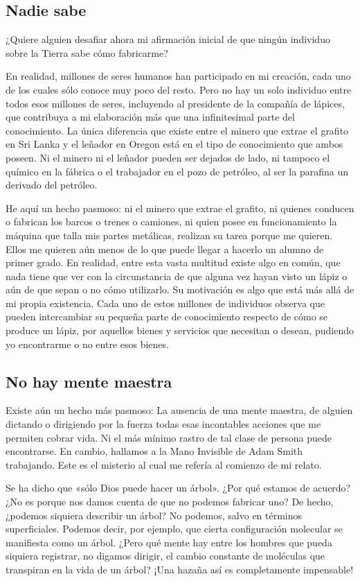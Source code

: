 \documentclass[12pt,a4paper,twoside]{book}
\begin{document}
\subsection{Nadie sabe}
¿Quiere alguien desafiar ahora mi afirmación inicial de que ningún individuo sobre la Tierra sabe cómo fabricarme?

En realidad, millones de seres humanos han participado en mi creación, cada uno de los cuales sólo conoce muy poco del resto. Pero no hay un solo individuo entre todos esos millones de seres, incluyendo al presidente de la compañía de lápices, que contribuya a mi elaboración más que una infinitesimal parte del conocimiento. La única diferencia que existe entre el minero que extrae el grafito en Sri Lanka y el leñador en Oregon está en el tipo de conocimiento que ambos poseen. Ni el minero ni el leñador pueden ser dejados de lado, ni tampoco el químico en la fábrica o el trabajador en el pozo de petróleo, al ser la parafina un derivado del petróleo.

He aquí un hecho pasmoso: ni el minero que extrae el grafito, ni quienes conducen o fabrican los barcos o trenes o camiones, ni quien posee en funcionamiento la máquina que talla mis partes metálicas, realizan su tarea porque me quieren. Ellos me quieren aún menos de lo que puede llegar a hacerlo un alumno de primer grado. En realidad, entre esta vasta multitud existe algo en común, que nada tiene que ver con la circunstancia de que alguna vez hayan visto un lápiz o aún de que sepan o no cómo utilizarlo. Su motivación es algo que está más allá de mi propia existencia. Cada uno de estos millones de individuos observa que pueden intercambiar su pequeña parte de conocimiento respecto de cómo se produce un lápiz, por aquellos bienes y servicios que necesitan o desean, pudiendo yo encontrarme o no entre esos bienes.

\subsection{No hay mente maestra}
Existe aún un hecho más pasmoso: La ausencia de una mente maestra, de alguien dictando o dirigiendo por la fuerza todas esas incontables acciones que me permiten cobrar vida. Ni el más mínimo rastro de tal clase de persona puede encontrarse. En cambio, hallamos a la Mano Invisible de Adam Smith trabajando. Este es el misterio al cual me refería al comienzo de mi relato.

Se ha dicho que «sólo Dios puede hacer un árbol». ¿Por qué estamos de acuerdo? ¿No es porque nos damos cuenta de que no podemos fabricar uno? De hecho, ¿podemos siquiera describir un árbol? No podemos, salvo en términos superficiales. Podemos decir, por ejemplo, que cierta configuración molecular se manifiesta como un árbol. ¿Pero qué mente hay entre los hombres que pueda siquiera registrar, no digamos dirigir, el cambio constante de moléculas que transpiran en la vida de un árbol? ¡Una hazaña así es completamente impensable!
\end{document}
